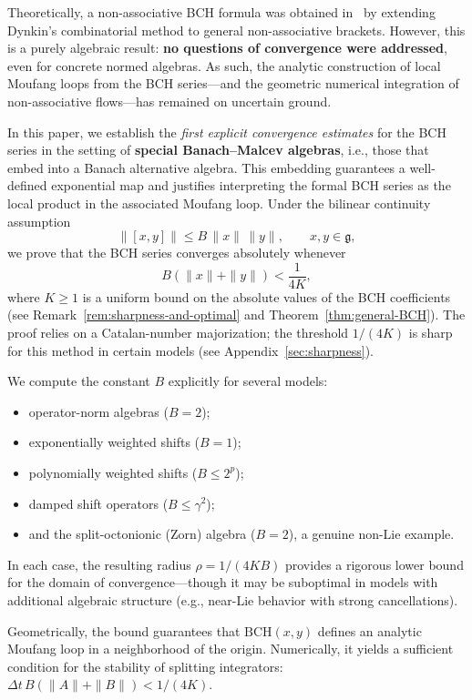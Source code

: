 \documentclass[11pt]{amsart}
\numberwithin{equation}{section}
\theoremstyle{remark}
\begin{document}
\medskip

Theoretically, a non-associative BCH formula was obtained in~\cite{Mostovoy2016} by extending Dynkin’s combinatorial method to general non-associative brackets. However, this is a purely algebraic result: \textbf{no questions of convergence were addressed}, even for concrete normed algebras. As such, the analytic construction of local Moufang loops from the BCH series—and the geometric numerical integration of non-associative flows—has remained on uncertain ground.

\medskip

In this paper, we establish the \emph{first explicit convergence estimates} for the BCH series in the setting of \textbf{special Banach--Malcev algebras}, i.e., those that embed into a Banach alternative algebra. This embedding guarantees a well-defined exponential map and justifies interpreting the formal BCH series as the local product in the associated Moufang loop. Under the bilinear continuity assumption
\[
\|[x,y]\| \le B\,\|x\|\,\|y\|, \qquad x,y\in\mathfrak g,
\]
we prove that the BCH series converges absolutely whenever
\[
B(\|x\| + \|y\|) < \frac{1}{4K},
\]
where $K \geq 1$ is a uniform bound on the absolute values of the BCH coefficients (see Remark~\ref{rem:sharpness-and-optimal} and Theorem~\ref{thm:general-BCH}). The proof relies on a Catalan-number majorization; the threshold $1/(4K)$ is sharp for this method in certain models (see Appendix~\ref{sec:sharpness}).

\medskip

We compute the constant $B$ explicitly for several models:\begin{itemize}
\item operator-norm algebras ($B=2$);
\item exponentially weighted shifts ($B=1$);
\item polynomially weighted shifts ($B\le 2^p$);
\item damped shift operators ($B\le \gamma^2$);
\item and the split-octonionic (Zorn) algebra ($B = 2$), a genuine non-Lie example.\end{itemize}
In each case, the resulting radius $\rho = 1/(4KB)$ provides a rigorous lower bound for the domain of convergence—though it may be suboptimal in models with additional algebraic structure (e.g., near-Lie behavior with strong cancellations).

\medskip

Geometrically, the bound guarantees that $\mathrm{BCH}(x,y)$ defines an analytic Moufang loop in a neighborhood of the origin. Numerically, it yields a sufficient condition for the stability of splitting integrators: $\Delta t\,B(\|A\| + \|B\|) < 1/(4K)$.
\end{document}
